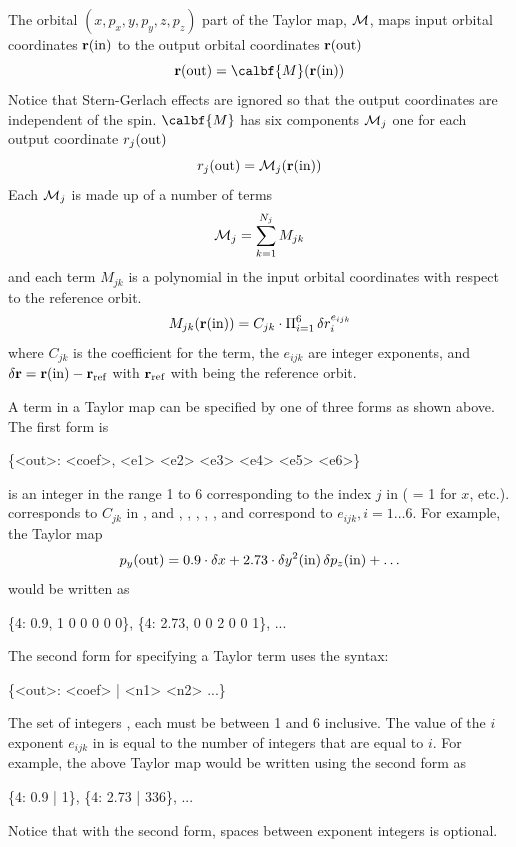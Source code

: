 {The orbital $(x, p_x, y, p_y, z, p_z)$ part of the Taylor map, ${\cal M}$, maps input orbital coordinates
${\bf r}({\text{in}})$ to the output orbital coordinates ${\bf r}({\text{out}})$
\begin{equation}
  \bfr(\Out) = \calbf{M}(\bfr(\In))
  \label{rmr}
\end{equation}
Notice that Stern-Gerlach effects are ignored so that the output coordinates are independent of the
spin. $\calbf{M}$ has six components ${\cal M}_j$ one for each output coordinate $r_j({\text{out}})$
\begin{equation}
  r_j({\text{out}}) = {\cal M}_j({\bf r}({\text{in}}))
  \label{rmr2}
\end{equation}
Each ${\cal M}_j$ is made up of a number of terms
\begin{equation}
  {\cal M}_j = \sum_{k = 1}^{N_j} M_{jk}
\end{equation}
and each term $M_{jk}$ is a polynomial in the input orbital coordinates with respect to the reference orbit.
\begin{equation}
  M_{jk}({\bf r}({\text{in}})) = C_{jk} \cdot \Pi_{i = 1}^6 \, \delta r_i^{e_{ijk}}
  \label{mcpd}
\end{equation}
where $C_{jk}$ is the coefficient for the term, the $e_{ijk}$ are integer exponents, and $\delta
{\bf r} = {\bf r}({\text{in}}) - {\bf r}_{\text{ref}}$ with ${\bf r}_{\text{ref}}$ with being the reference orbit.

A term in a Taylor map can be specified by one of three forms as shown above. The first form is
\begin{example}
  \{<out>: <coef>, <e1> <e2> <e3> <e4> <e5> <e6>\}
\end{example}
 is an integer in the range 1 to 6 corresponding to the index $j$ in  (
= 1 for $x$, etc.).  corresponds to $C_{jk}$ in , and , ,
, , , and  correspond to $e_{ijk}, i = 1 \ldots 6$.
For example, the Taylor map 
\begin{equation}
  p_y({\text{out}}) = 0.9 \cdot \delta x + 2.73 \cdot \delta y^2({\text{in}}) \, \delta p_z({\text{in}}) + \ldots
\end{equation}
would be written as
\begin{example}
  \{4: 0.9, 1 0 0 0 0 0\}, \{4: 2.73, 0 0 2 0 0 1\}, ...
\end{example}

The second form for specifying a Taylor term uses the syntax:
\begin{example}
  \{<out>: <coef> | <n1> <n2> ...\}
\end{example}
The set of integers ,  each must be between 1 and 6 inclusive. The value of the
$i$\Th exponent $e_{ijk}$ in  is equal to the number of integers that are equal to $i$. For
example, the above Taylor map would be written using the second form as
\begin{example}
  \{4: 0.9 | 1\}, \{4: 2.73 | 336\}, ...
\end{example}
Notice that with the second form, spaces between exponent integers is optional.

}
